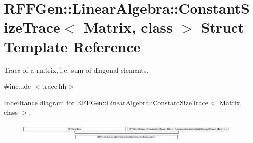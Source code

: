 \hypertarget{structRFFGen_1_1LinearAlgebra_1_1ConstantSizeTrace}{\section{R\-F\-F\-Gen\-:\-:Linear\-Algebra\-:\-:Constant\-Size\-Trace$<$ Matrix, class $>$ Struct Template Reference}
\label{structRFFGen_1_1LinearAlgebra_1_1ConstantSizeTrace}
}


Trace of a matrix, i.\-e. sum of diagonal elements.  




{\ttfamily \#include $<$trace.\-hh$>$}

Inheritance diagram for R\-F\-F\-Gen\-:\-:Linear\-Algebra\-:\-:Constant\-Size\-Trace$<$ Matrix, class $>$\-:\begin{figure}[H]
\begin{center}
\leavevmode
\includegraphics[height=0.918033cm]{structRFFGen_1_1LinearAlgebra_1_1ConstantSizeTrace}
\end{center}
\end{figure}

